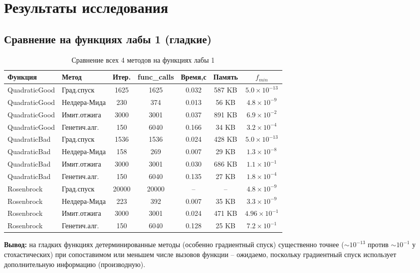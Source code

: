 \documentclass[12pt,a4paper]{article}
\begin{document}
\section{Результаты исследования}

\subsection{Сравнение на функциях лабы 1 (гладкие)}

\begin{table}[h]
\centering
\small
\begin{tabular}{llccccc}
\toprule
Функция & Метод & Итер. & func\_calls & Время,с & Память & $f_{min}$ \\
\midrule
QuadraticGood & Град.спуск & 1625 & 1625 & 0.032 & 587 KB & $5.0\times10^{-13}$ \\
QuadraticGood & Нелдера-Мида & 230 & 374 & 0.013 & 56 KB & $4.8\times10^{-9}$ \\
QuadraticGood & Имит.отжига & 3000 & 3001 & 0.037 & 891 KB & $6.9\times10^{-2}$ \\
QuadraticGood & Генетич.алг. & 150 & 6040 & 0.166 & 34 KB & $3.2\times10^{-4}$ \\
QuadraticBad & Град.спуск & 1536 & 1536 & 0.024 & 428 KB & $5.0\times10^{-13}$ \\
QuadraticBad & Нелдера-Мида & 158 & 269 & 0.007 & 29 KB & $1.3\times10^{-8}$ \\
QuadraticBad & Имит.отжига & 3000 & 3001 & 0.030 & 686 KB & $1.1\times10^{-1}$ \\
QuadraticBad & Генетич.алг. & 150 & 6040 & 0.135 & 27 KB & $1.8\times10^{-4}$ \\
Rosenbrock & Град.спуск & 20000 & 20000 & -- & -- & $4.8\times10^{-9}$ \\
Rosenbrock & Нелдера-Мида & 223 & 392 & 0.007 & 35 KB & $3.3\times10^{-9}$ \\
Rosenbrock & Имит.отжига & 3000 & 3001 & 0.024 & 471 KB & $4.96\times10^{-1}$ \\
Rosenbrock & Генетич.алг. & 150 & 6040 & 0.128 & 25 KB & $7.2\times10^{-1}$ \\
\bottomrule
\end{tabular}
\caption{Сравнение всех 4 методов на функциях лабы 1}
\end{table}

\textbf{Вывод:} на гладких функциях детерминированные методы (особенно
градиентный спуск) существенно точнее ($\sim10^{-13}$ против
$\sim10^{-1}$ у стохастических) при сопоставимом или меньшем числе
вызовов функции -- ожидаемо, поскольку градиентный спуск использует
дополнительную информацию (производную).
\end{document}
